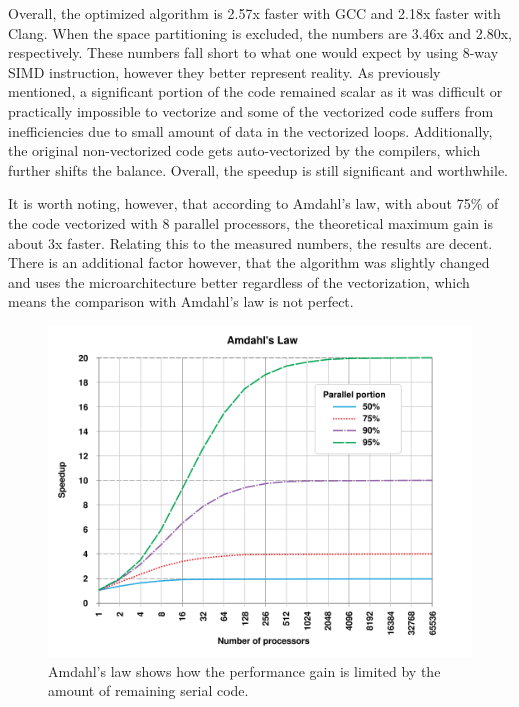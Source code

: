 \documentclass[12pt]{article}
\begin{document}
Overall, the optimized algorithm is 2.57x faster with GCC and 2.18x faster with Clang. When the space partitioning is excluded, the numbers are 3.46x and 2.80x, respectively. These numbers fall short to what one would expect by using 8-way SIMD instruction, however they better represent reality. As previously mentioned, a significant portion of the code remained scalar as it was difficult or practically impossible to vectorize and some of the vectorized code suffers from inefficiencies due to small amount of data in the vectorized loops. Additionally, the original non-vectorized code gets auto-vectorized by the compilers, which further shifts the balance. Overall, the speedup is still significant and worthwhile.

It is worth noting, however, that according to Amdahl's law, with about 75\% of the code vectorized with 8 parallel processors, the theoretical maximum gain is about 3x faster. Relating this to the measured numbers, the results are decent. There is an additional factor however, that the algorithm was slightly changed and uses the microarchitecture better regardless of the vectorization, which means the comparison with Amdahl's law is not perfect.

\begin{figure}[H]
	\begin{center}
		\includegraphics[width=\textwidth]{amdahls_law}
	\end{center}
	\caption[Amdahl's law applied to vectorization]{Amdahl's law shows how the performance gain is limited by the amount of remaining serial code.}
	\label{fig_amdahls_law}
\end{figure}
\end{document}
